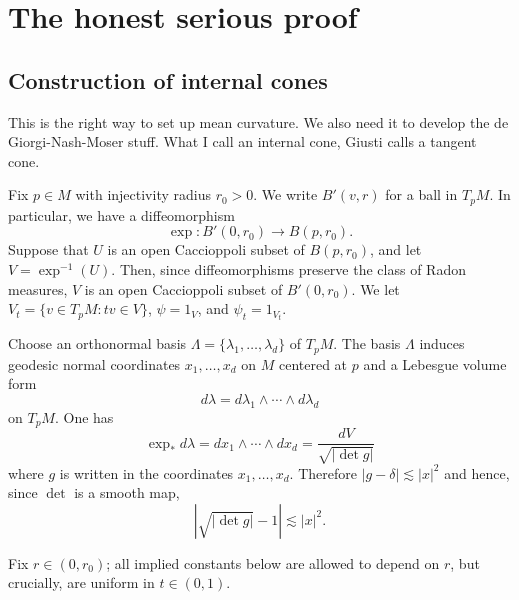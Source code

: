 \documentclass[reqno,12pt,letterpaper]{amsart}
\theoremstyle{definition}
\numberwithin{equation}{section}
\begin{document}
\section{The honest serious proof}
\subsection{Construction of internal cones}
This is the right way to set up mean curvature.
We also need it to develop the de Giorgi-Nash-Moser stuff.
What I call an internal cone, Giusti calls a tangent cone.

Fix $p \in M$ with injectivity radius $r_0 > 0$.
We write $B'(v, r)$ for a ball in $T_pM$.
In particular, we have a diffeomorphism
$$\exp: B'(0, r_0) \to B(p, r_0).$$
Suppose that $U$ is an open Caccioppoli subset of $B(p, r_0)$, and let $V = \exp^{-1}(U)$.
Then, since diffeomorphisms preserve the class of Radon measures, $V$ is an open Caccioppoli subset of $B'(0, r_0)$.
We let $V_t = \{v \in T_pM: tv \in V\}$, $\psi = 1_V$, and $\psi_t = 1_{V_t}$.

Choose an orthonormal basis $\Lambda = \{\lambda_1, \dots, \lambda_d\}$ of $T_pM$.
The basis $\Lambda$ induces geodesic normal coordinates $x_1, \dots, x_d$ on $M$ centered at $p$ and a Lebesgue volume form
$$d\lambda = d\lambda_1 \wedge \cdots \wedge d\lambda_d$$
on $T_pM$.
One has
\begin{equation}\label{pushforward of flat measure}
\exp_* d\lambda = dx_1 \wedge \cdots \wedge dx_d = \frac{dV}{\sqrt{|\det g|}}
\end{equation}
where $g$ is written in the coordinates $x_1, \dots, x_d$.
Therefore $|g - \delta| \lesssim |x|^2$ and hence, since $\det$ is a smooth map,
\begin{equation}\label{determinant bounds}
|\sqrt{|\det g|} - 1| \lesssim |x|^2.
\end{equation}

Fix $r \in (0, r_0)$; all implied constants below are allowed to depend on $r$, but crucially, are uniform in $t \in (0, 1)$.
\end{document}
